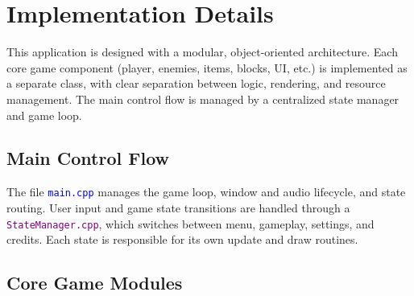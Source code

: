\clearpage
\section{Implementation Details}
\begin{flushleft}

This application is designed with a modular, object-oriented architecture. Each core game component (player, enemies, items, blocks, UI, etc.) is implemented as a separate class, with clear separation between logic, rendering, and resource management. The main control flow is managed by a centralized state manager and game loop.

\subsection*{Main Control Flow }

The file \texttt{\textcolor{blue}{main.cpp}} manages the game loop, window and audio lifecycle, and state routing. User input and game state transitions are handled through a \texttt{\textcolor{purple}{StateManager.cpp}}, which switches between menu, gameplay, settings, and credits. Each state is responsible for its own update and draw routines.

\subsection*{Core Game Modules}


\end{flushleft}
